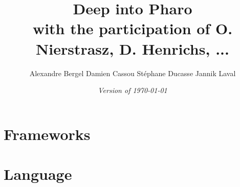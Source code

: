 \documentclass[a4paper,10pt,twoside]{book}
\begin{document}
\frontmatter
\setcounter{page}{1}
\pagestyle{headings}
\author{
	Alexandre Bergel\quad
	Damien Cassou\quad
	St\'ephane Ducasse\quad
	Jannik Laval\quad}
\title{\Huge\bf Deep into Pharo\\[1ex]
\small with the participation of O. Nierstrasz, D. Henrichs, ... }
\isodate
\date{\emph{Version of \today}}
\maketitle
\tableofcontents
\sloppy %
\mainmatter


\part{Frameworks}

%







\part{Language}

\end{document}
